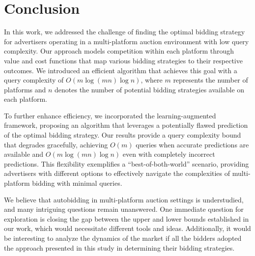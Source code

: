 \section{Conclusion}
In this work, we addressed the challenge of finding the optimal bidding strategy for advertisers operating in a multi-platform auction environment with low query complexity. Our approach models competition within each platform through value and cost functions that map various bidding strategies to their respective outcomes. We introduced an efficient algorithm that achieves this goal with a query complexity of \(O(m \log (mn) \log n)\), where \(m\) represents the number of platforms and \(n\) denotes the number of potential bidding strategies available on each platform. 

To further enhance efficiency, we incorporated the learning-augmented framework, proposing an algorithm that leverages a potentially flawed prediction of the optimal bidding strategy. Our results provide a query complexity bound that degrades gracefully, achieving \(O(m)\) queries when accurate predictions are available and \(O(m \log (mn) \log n)\) even with completely incorrect predictions. This flexibility exemplifies a ``best-of-both-world'' scenario, providing advertisers with different options to effectively navigate the complexities of multi-platform bidding with minimal queries.

We believe that autobidding in multi-platform auction settings is understudied, and many intriguing questions remain unanswered. One immediate question for exploration is closing the gap between the upper and lower bounds established in our work, which would necessitate different tools and ideas. Additionally, it would be interesting to analyze the dynamics of the market if all the bidders adopted the approach presented in this study in determining their bidding strategies.

